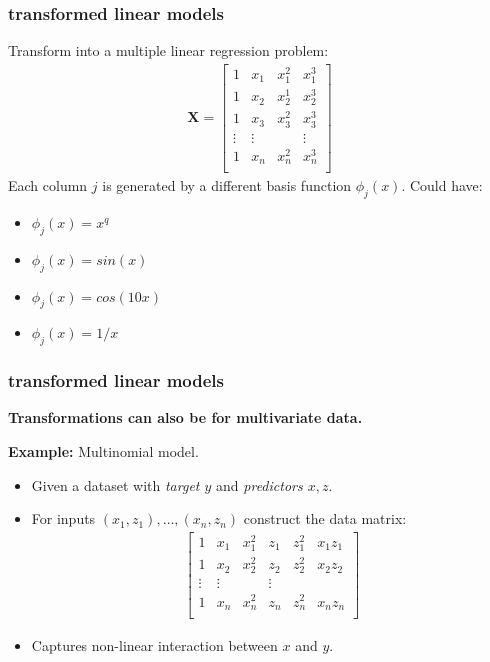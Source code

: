 \documentclass[handout,compress]{beamer}
\begin{document}
\begin{frame}
	\frametitle{transformed linear models}
	Transform into a multiple linear regression problem:
	\begin{align*}
	\textbf{X} = \begin{bmatrix}
	1 & x_1  &  x_1^2 & x_1^3\\
	1 & x_2  &  x_2^1 &  x_2^3 \\
	1 & x_3  &  x_3^2 &  x_3^3\\
	\vdots & \vdots  &  &\vdots\\
	1 & x_n  &  x_n^2 & x_n^3\\ 
	\end{bmatrix}
	\end{align*}
	Each column $j$ is generated by a different basis function $\phi_j(x)$. Could have:
	\begin{itemize}
		\item $\phi_j(x) = x^q$
		\item $\phi_j(x) = sin(x)$
		\item $\phi_j(x) = cos(10x)$
		\item $\phi_j(x) = 1/x$
	\end{itemize}
\end{frame}

\begin{frame}
	\frametitle{transformed linear models}
	\begin{center}
		\textbf{Transformations can also be for multivariate data.}
	\end{center}
	\textbf{Example:} Multinomial model.
	\begin{itemize}
		\item Given a dataset with \emph{target $y$} and \emph{predictors $x, z$}.
		\item For inputs $(x_1,z_1), \ldots, (x_n,z_n)$ construct the data matrix:
		\begin{align*}
		\begin{bmatrix}
		1 & x_1  &  x_1^2 & z_1 & z_1^2 & x_1z_1\\
		1 & x_2  &  x_2^2 & z_2 & z_2^2 & x_2z_2\\
		\vdots & \vdots  &  &\vdots\\
		1 & x_n  &  x_n^2 & z_n & z_n^2 & x_nz_n\\
		\end{bmatrix}
		\end{align*}
		\item Captures non-linear interaction between $x$ and $y$.
	\end{itemize}
\end{frame}
\end{document}
